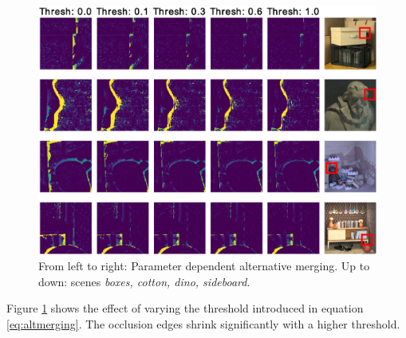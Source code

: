 \documentclass  [
  paper    = a4,
  BCOR     = 10mm,
  twoside,
  fontsize = 12pt,
  fleqn,
  toc      = bibnumbered,
  toc      = listofnumbered,
  numbers  = noendperiod,
  headings = normal,
  listof   = leveldown,
  version  = 3.03
]                                       {scrreprt}
\begin{document}
\begin{figure}
	\centering
	\includegraphics[width=1\linewidth]{images/choose_lower_difference}
	\caption[Alternative Merging:Parameter dependence]{From left to right: Parameter dependent alternative merging. Up to down: scenes \textit{boxes, cotton, dino, sideboard}.}
	\label{fig:chooselowerdifference-eps-converted-to}
\end{figure}

 Figure \ref{fig:chooselowerdifference-eps-converted-to} shows the effect of varying the threshold introduced in equation \ref{eq:altmerging}. The occlusion edges shrink significantly with a higher threshold.
\end{document}
